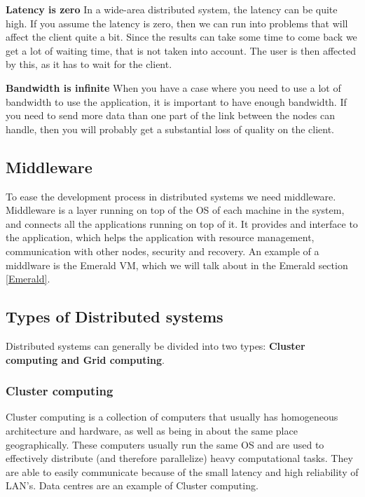 \textbf{Latency is zero}
In a wide-area distributed system, the latency can be quite high. If you assume the latency is zero, then we can run into problems that will affect the client quite a bit. Since the results can take some time to come back we get a lot of waiting time, that is not taken into account. The user is then affected by this, as it has to wait for the client. 

\textbf{Bandwidth is infinite}
When you have a case where you need to use a lot of bandwidth to use the application, it is important to have enough bandwidth. If you need to send more data than one part of the link between the nodes can handle, then you will probably get a substantial loss of quality on the client. 


\subsection{Middleware}
To ease the development process in distributed systems we need middleware. Middleware is a layer running on top of the OS of each machine in the system, and connects all the applications running on top of it. It provides and interface to the application, which helps the application with resource management, communication with other nodes, security and recovery\cite{steen_distributed_2017}. An example of a middlware is the Emerald VM, which we will talk about in the Emerald section \ref{Emerald}. 


\subsection{Types of Distributed systems}
Distributed systems can generally be divided into two types: \textbf{Cluster computing and Grid computing}.

\subsubsection{Cluster computing}
Cluster computing is a collection of computers that usually has homogeneous architecture and hardware, as well as being in about the same place geographically. These computers usually run the same OS and are used to effectively distribute (and therefore parallelize) heavy computational tasks. They are able to easily communicate because of the small latency and high reliability of LAN's. Data centres are an example of Cluster computing. 

